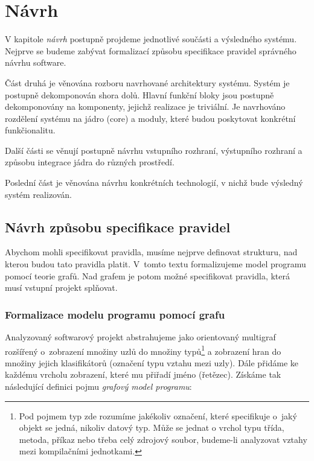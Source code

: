 \chapter{Návrh}

V kapitole \emph{návrh} postupně projdeme jednotlivé součásti a výsledného systému. Nejprve se budeme zabývat formalizací způsobu specifikace pravidel správného návrhu software.

Část druhá je věnována rozboru navrhované architektury systému. Systém je postupně dekomponován shora dolů. Hlavní funkční bloky jsou postupně dekomponovány na komponenty, jejichž realizace je triviální. Je navrhováno rozdělení systému na jádro (core) a moduly, které budou poskytovat konkrétní funkčionalitu.

Další části se věnují postupně návrhu vstupního rozhraní, výstupního rozhraní a způsobu integrace jádra do různých prostředí.

Poslední část je věnována návrhu konkrétních technologií, v nichž bude výsledný systém realizován.

\section{Návrh způsobu specifikace pravidel}

Abychom mohli specifikovat pravidla, musíme nejprve definovat strukturu, nad kterou budou tato pravidla platit. V~tomto textu formalizujeme model programu pomocí teorie grafů. Nad grafem je potom možné specifikovat pravidla, která musí vstupní projekt splňovat.

\subsection{Formalizace modelu programu pomocí grafu}
\label{design-graph_formalization}

Analyzovaný softwarový projekt abstrahujeme jako orientovaný multigraf rozšířený o~zobrazení množiny uzlů do množiny typů\footnote{Pod pojmem typ zde rozumíme jakékoliv označení, které specifikuje o~jaký objekt se jedná, nikoliv datový typ. Může se jednat o vrchol typu třída, metoda, příkaz nebo třeba celý zdrojový soubor, budeme-li analyzovat vztahy mezi kompilačními jednotkami.} a zobrazení hran do množiny jejich klasifikátorů (označení typu vztahu mezi uzly). Dále přidáme ke každému vrcholu zobrazení, které mu přiřadí jméno (řetězec). Získáme tak následující definici pojmu \emph{grafový model programu}:

